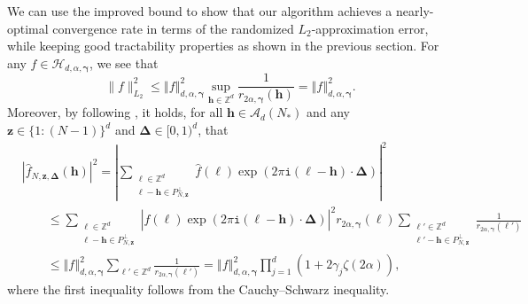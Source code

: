 \documentclass[pdflatex,sn-basic,Numbered]{sn-jnl}%
\newcommand{\bsh}{\boldsymbol{h}}
\newcommand{\bsl}{\boldsymbol{\ell}}
\newcommand{\bsz}{\boldsymbol{z}}
\newcommand{\bsgamma}{\boldsymbol{\gamma}}
\newcommand{\bsDelta}{\boldsymbol{\Delta}}
\newcommand{\ZZ}{\mathbb{Z}}
\newcommand{\Acal}{\mathcal{A}}
\newcommand{\Hcal}{\mathcal{H}}
\newcommand{\icomp}{\mathtt{i}}
\newcommand{\norm}[1]{\left\Vert#1\right\Vert}
\theoremstyle{thmstyleone}%
\theoremstyle{thmstyletwo}%
\begin{document}
We can use the improved bound to show that our algorithm achieves a nearly-optimal convergence rate in terms of the randomized $L_2$-approximation error, while keeping good tractability properties as shown in the previous section. For any $f\in \Hcal_{d,\alpha,\bsgamma}$, 
we see that
\[ \|f\|_{L_2}^2 \leq \norm{f}_{d,\alpha,\bsgamma}^2 \sup_{\bsh\in \ZZ^d}\frac{1}{r_{2\alpha,\bsgamma} (\bsh)}=\norm{f}_{d,\alpha,\bsgamma}^2. \]
Moreover, by following \cite[Proof of Lemma~4.2]{CGK24}, it holds, for all $\bsh\in \Acal_d(N_*)$ and any $\bsz\in \{1{:}(N-1)\}^d$ and $\bsDelta\in [0,1)^d$, that
\begin{align*}
    & \left|\widehat{f}_{N,\bsz,\bsDelta}(\bsh)\right|^2 = \left|\sum_{\substack{\bsl\in \ZZ^d\\ \bsl-\bsh\in P_{N,\bsz}^\perp}}\widehat{f}(\bsl)\exp(2\pi\icomp (\bsl-\bsh)\cdot\bsDelta)\right|^2\\
    & \qquad \leq \sum_{\substack{\bsl\in \ZZ^d\\ \bsl-\bsh\in P_{N,\bsz}^\perp}}\left|\widehat{f}(\bsl)\exp(2\pi\icomp (\bsl-\bsh)\cdot\bsDelta)\right|^2 r_{2\alpha,\bsgamma} (\bsl) \sum_{\substack{\bsl'\in \ZZ^d\\ \bsl'-\bsh\in P_{N,\bsz}^\perp}}\frac{1}{r_{2\alpha,\bsgamma} (\bsl')}\\
    & \qquad \leq \norm{f}_{d,\alpha,\bsgamma}^2\sum_{\bsl'\in \ZZ^d}\frac{1}{r_{2\alpha,\bsgamma} (\bsl')} = \norm{f}_{d,\alpha,\bsgamma}^2\prod_{j=1}^{d}\left( 1+2\gamma_j\zeta(2\alpha)\right),
\end{align*}
where the first inequality follows from the Cauchy--Schwarz inequality.
\end{document}
